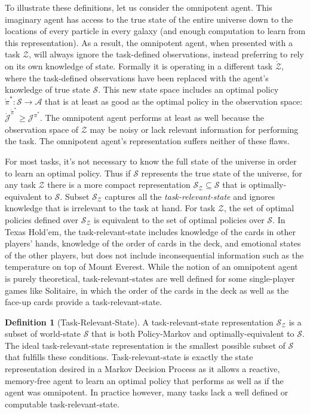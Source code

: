 \documentclass{article} %
\theoremstyle{definition}
\newtheorem{definition}{Definition}[section]
\begin{document}
To illustrate these definitions, let us consider the omnipotent
agent. This imaginary agent has access to the true state of the entire
universe down to the locations of every particle in every galaxy (and
enough computation to learn from this representation). As a result,
the omnipotent agent, when presented with a task $\mathcal{Z}$, will
always ignore the task-defined observations, instead preferring to
rely on its own knowledge of state. Formally it is operating in a
different task $\mathring{\mathcal{Z}}$, where the task-defined
observations have been replaced with the agent's knowledge of true
state $\mathcal{S}$. This new state space includes an optimal policy
$\mathring{\pi}^*: \mathcal{S} \rightarrow \mathcal{A}$ that is at
least as good as the optimal policy in the observation space:
$\mathring{\mathcal{J}}^{\mathring{\pi}^*} \ge
\mathcal{J}^{\pi^*}$. The omnipotent agent performs at least as well
because the observation space of $\mathcal{Z}$ may be noisy or lack
relevant information for performing the task. The omnipotent agent's
representation suffers neither of these flaws.

For most tasks, it's not necessary to know the full state of the
universe in order to learn an optimal policy. Thus if $\mathcal{S}$
represents the true state of the universe, for any task $\mathcal{Z}$
there is a more compact representation $\mathcal{S}_\mathcal{Z}
\subseteq \mathcal{S}$ that is optimally-equivalent to
$\mathcal{S}$. Subset $\mathcal{S}_\mathcal{Z}$ captures all the
\textit{task-relevant-state} and ignores knowledge that is irrelevant
to the task at hand. For task $\mathcal{Z}$, the set of optimal
policies defined over $\mathcal{S}_\mathcal{Z}$ is equivalent to the
set of optimal policies over $\mathcal{S}$. In Texas Hold'em, the
task-relevant-state includes knowledge of the cards in other players'
hands, knowledge of the order of cards in the deck, and emotional
states of the other players, but does not include inconsequential
information such as the temperature on top of Mount Everest. While the
notion of an omnipotent agent is purely theoretical,
task-relevant-states are well defined for some single-player games
like Solitaire, in which the order of the cards in the deck as well as
the face-up cards provide a task-relevant-state.

\begin{definition}[Task-Relevant-State]
\label{def:taskRelState}
A task-relevant-state representation $\mathcal{S}_\mathcal{Z}$ is a
subset of world-state $\mathcal{S}$ that is both Policy-Markov and
optimally-equivalent to $\mathcal{S}$. The ideal task-relevant-state
representation is the smallest possible subset of $\mathcal{S}$ that
fulfills these conditions. Task-relevant-state is exactly the state
representation desired in a Markov Decision Process as it allows a
reactive, memory-free agent to learn an optimal policy that performs
as well as if the agent was omnipotent. In practice however, many
tasks lack a well defined or computable task-relevant-state.
\end{definition}
\end{document}
